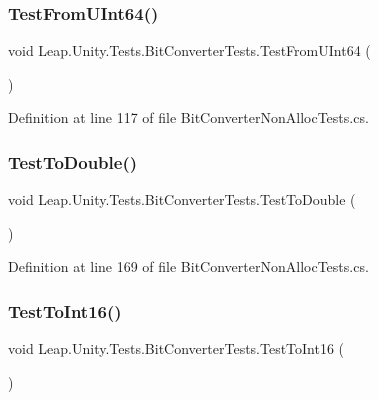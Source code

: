 \subsubsection{\texorpdfstring{TestFromUInt64()}{TestFromUInt64()}}
{\footnotesize\ttfamily void Leap.\+Unity.\+Tests.\+Bit\+Converter\+Tests.\+Test\+From\+U\+Int64 (\begin{DoxyParamCaption}{ }\end{DoxyParamCaption})}



Definition at line 117 of file Bit\+Converter\+Non\+Alloc\+Tests.\+cs.

\mbox{\label{class_leap_1_1_unity_1_1_tests_1_1_bit_converter_tests_a22cf885ce832a5d32331aaf7c0ccb9ca}} 
\subsubsection{\texorpdfstring{TestToDouble()}{TestToDouble()}}
{\footnotesize\ttfamily void Leap.\+Unity.\+Tests.\+Bit\+Converter\+Tests.\+Test\+To\+Double (\begin{DoxyParamCaption}{ }\end{DoxyParamCaption})}



Definition at line 169 of file Bit\+Converter\+Non\+Alloc\+Tests.\+cs.

\mbox{\label{class_leap_1_1_unity_1_1_tests_1_1_bit_converter_tests_a9eae1df51bd67e944cd6187e24c9970d}} 
\subsubsection{\texorpdfstring{TestToInt16()}{TestToInt16()}}
{\footnotesize\ttfamily void Leap.\+Unity.\+Tests.\+Bit\+Converter\+Tests.\+Test\+To\+Int16 (\begin{DoxyParamCaption}{ }\end{DoxyParamCaption})}



